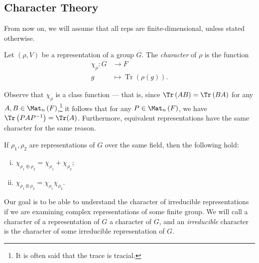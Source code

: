 \documentclass[10pt]{mypackage}
\begin{document}
\subsection{Character Theory}%
From now on, we will assume that all reps are finite-dimensional, unless stated otherwise.
\begin{definition}
  Let $\left( \rho,V \right)$ be a representation of a group $G$. The \textit{character} of $\rho$ is the function
  \begin{align*}
    \chi_{\rho}\colon G &\rightarrow F\\
    g &\mapsto \operatorname{Tr}\left( \rho(g) \right).
  \end{align*}
\end{definition}
Observe that $\chi_{\rho}$ is a class function --- that is, since $\Tr\left( AB \right) = \Tr\left( BA \right)$ for any $A,B\in \Mat_n\left( F \right)$,\footnote{It is often said that the trace is tracial.} it follows that for any $P\in \Mat_n\left( F \right)$, we have $\Tr\left( PAP^{-1} \right) = \Tr(A)$. Furthermore, equivalent representations have the same character for the same reason.
\begin{lemma}
  If $\rho_1,\rho_2$ are representations of $G$ over the same field, then the following hold:
  \begin{enumerate}[(i)]
    \item $\chi_{\rho_1\oplus \rho_2} = \chi_{\rho_1} + \chi_{\rho_2}$;
    \item $\chi_{\rho_1\otimes \rho_2} = \chi_{\rho_1}\chi_{\rho_2}$.
  \end{enumerate}
\end{lemma}
Our goal is to be able to understand the character of irreducible representations if we are examining complex representations of some finite group. We will call a character of a representation of $G$ a character of $G$, and an \textit{irreducible} character is the character of some irreducible representation of $G$.
\end{document}
